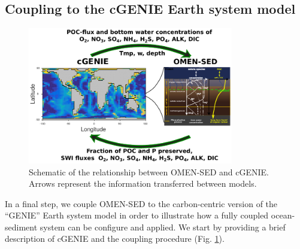 \documentclass[gmd, manuscript]{copernicus}
\begin{document}
\subsection{Coupling to the cGENIE Earth system model}\label{subsubsec:Methods_ESM_coupling}
\begin{figure}[tbp]
\begin{center}
	\includegraphics[width=0.8\textwidth]{figures/OMEN-GENIE-coupling_GRID.pdf}
	\caption{Schematic of the relationship between OMEN-SED and cGENIE. Arrows represent the information transferred between models. }
	\label{fig:OMEN-GENIE-coupling}
	\end{center}
\end{figure}
In a final step, we couple OMEN-SED to the carbon-centric version of the ``GENIE'' Earth system model \citep[cGENIE,][]{ridgwell_marine_2007} in order to illustrate how a fully coupled ocean-sediment system can be 
configure and applied. We start by providing a brief description of cGENIE and the coupling procedure (Fig. \ref{fig:OMEN-GENIE-coupling}). 
\end{document}
